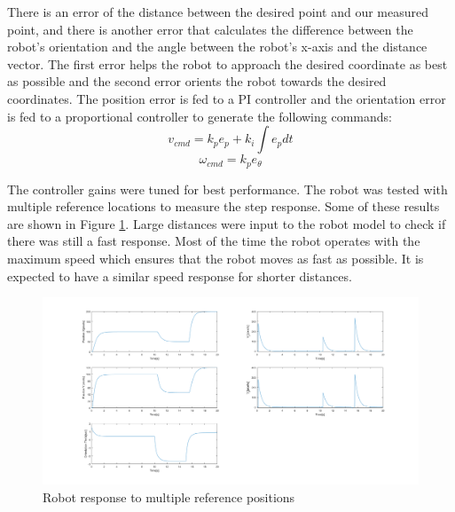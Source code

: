 There is an error of the distance between the desired point and our measured point, and there is another error that calculates the difference between the robot’s orientation and the angle between the robot’s x-axis and the distance vector. The first error helps the robot to approach the desired coordinate as best as possible and the second error orients the robot towards the desired coordinates. The position error is fed to a PI controller and the orientation error is fed to a proportional controller to generate the following commands:
\begin{equation}
    v_{cmd} = k_p e_p + k_i \int e_p dt 
\end{equation}
\begin{equation}
    \omega_{cmd} = k_p e_{\theta}
\end{equation}

The controller gains were tuned for best performance. The robot was tested with multiple reference locations to measure the step response. Some of these results are shown in Figure \ref{robot_resp}. Large distances were input to the robot model to check if there was still a fast response. Most of the time the robot operates with the maximum speed which ensures that the robot moves as fast as possible. It is expected to have a similar speed response for shorter distances.

\begin{figure}[thb]
    \centering
    \includegraphics[width=1\textwidth]{images/robot_response.png}
    \caption{Robot response to multiple reference positions}\label{robot_resp}
\end{figure}